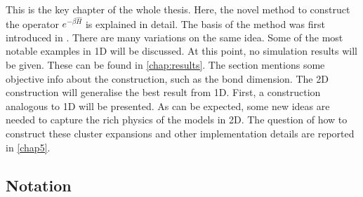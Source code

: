 This is the key chapter of the whole thesis. Here, the novel  method to construct the operator $e^{-\beta \hat{H}}$ is explained in detail. The basis of the method was first introduced in \cite{Vanhecke2021}. There are many variations on the same idea. Some of the most notable examples in 1D will be discussed. At this point, no simulation results will be given. These can be found in \cref{chap:results}. The section mentions some objective info about the construction, such as the bond dimension. The 2D construction will generalise the best result from 1D. First, a construction analogous to 1D will be presented. As can be expected, some new ideas are needed to capture the rich physics of the models in 2D. The question of how to construct these cluster expansions and other implementation details are reported in \cref{chap5}.

\subsection{Notation}

